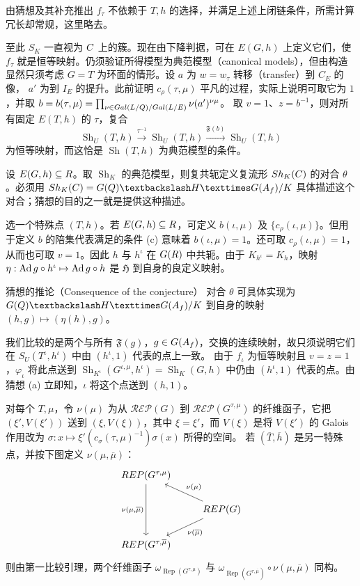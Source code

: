 由猜想及其补充推出 $f_\tau$ 不依赖于 $T,h$ 的选择，并满足上述上闭链条件，所需计算冗长却常规，这里略去。

至此 $S_K$ 一直视为 $C$ 上的簇。现在由下降判据，可在 $E(G,h)$ 上定义它们，使
$f_\tau$ 就是恒等映射。仍须验证所得模型为典范模型（canonical models），但由构造显然只须考虑
$G=T$ 为环面的情形。设 $a$ 为 $w=w_\tau$ 转移（transfer）到 $C_E$ 的像，
$a'$ 为到 $I_E$ 的提升。此前证明 $c_\rho(\tau,\mu)$ 平凡的过程，实际上说明可取它为
$1$，并取
$b=b(\tau,\mu)=\prod_{\nu\in Gal(L/Q)/Gal(L/E)}\nu(a')^{\nu\mu}$。
取 $v=1$、$z=b^{-1}$，则对所有固定 $E(T,h)$ 的 $\tau$，复合
\[
\operatorname{Sh}_U(T,h)\xrightarrow{\tau^{-1}}\operatorname{Sh}_U(T,h)
\xrightarrow{\mathfrak F(b)}\operatorname{Sh}_U(T,h)
\]
为恒等映射，而这恰是 $\operatorname{Sh}(T,h)$ 为典范模型的条件。

设 $E(G,h)\subseteq R$。取 $\operatorname{Sh}_K$ 的典范模型，则复共轭定义复流形
$Sh_K(C)$ 的对合 $\theta$。必须用
$\operatorname{Sh}_K(\C)=G(\Q)\backslash\mathfrak H\times G(\A_f)/K$
具体描述这个对合；猜想的目的之一就是提供这种描述。

选一个特殊点 $(T,h)$。若 $E(G,h)\subseteq R$，可定义
$b(\iota,\mu)$ 及 $\{c_\rho(\iota,\mu)\}$。但用于定义 $b$ 的陪集代表满足的条件
(c) 意味着 $b(\iota,\mu)=1$。还可取 $c_\rho(\iota,\mu)=1$，从而也可取
$v=1$。因此 $h$ 与 $h^\iota$ 在 $G(R)$ 中共轭。由于
$K_{h^\iota}=K_h$，映射
$\eta:\Ad g\circ h^\iota\mapsto\Ad g\circ h$ 是 $\mathfrak H$ 到自身的良定义映射。

\begin{originaltheorem}{猜想的推论（Consequence of the conjecture）}
对合 $\theta$ 可具体实现为 $G(\Q)\backslash\mathfrak H\times G(\A_f)/K$ 到自身的映射
$(h,g)\mapsto(\eta(h),g)$。
\end{originaltheorem}
我们比较的是两个与所有 $\mathfrak F(g)$，$g\in G(A_f)$，交换的连续映射，故只须说明它们在
$S_U(T^\iota,h^\iota)$ 中由 $(h^\iota,1)$ 代表的点上一致。
由于 $f_\iota$ 为恒等映射且 $v=z=1$，$\varphi_\iota$ 将此点送到
$\operatorname{Sh}_{K^\iota}(G^{\iota,\mu},h^\iota)=\operatorname{Sh}_K(G,h)$ 中仍由
$(h^\iota,1)$ 代表的点。由猜想 (a) 立即知，$\iota$ 将这个点送到 $(h,1)$。

对每个 $T,\mu$，令 $\nu(\mu)$ 为从 $\mathcal{REP}(G)$ 到
$\mathcal{REP}(G^{\tau,\mu})$ 的纤维函子，它把 $(\xi',V(\xi'))$ 送到
$(\xi,V(\xi))$，其中 $\xi=\xi'$，而 $V(\xi)$ 是将 $V(\xi')$ 的 Galois 作用改为
$\sigma:x\mapsto\xi'(c_\sigma(\tau,\mu)^{-1})\sigma(x)$ 所得的空间。
若 $(\overline T,\overline h)$ 是另一特殊点，并按下图定义 $\nu(\mu,\overline\mu)$：
\[
\begin{tikzcd}
\mathcal{REP}(G^{\tau,\mu})\arrow[dd,"{\nu(\mu,\overline\mu)}"']&\\
&\mathcal{REP}(G)\arrow[ul,"\nu(\mu)"']\arrow[dl,"\nu(\overline\mu)"]\\
\mathcal{REP}(G^{\tau,\overline\mu})&
\end{tikzcd}
\]
则由第一比较引理，两个纤维函子
$\omega_{\operatorname{Rep}(G^{\tau,\mu})}$ 与
$\omega_{\operatorname{Rep}(G^{\tau,\overline\mu})}\circ\nu(\mu,\overline\mu)$ 同构。

